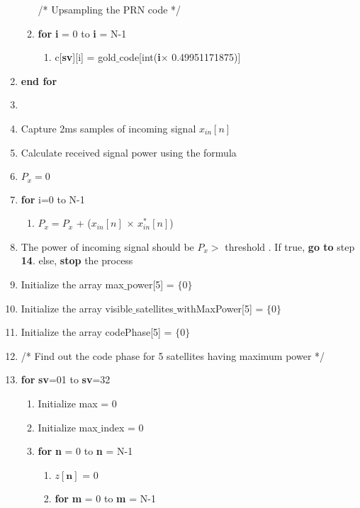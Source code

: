 \documentclass[journal,10pt,onecolumn]{article}
\begin{document}
\begin{enumerate}
\begin{enumerate}
    /* Upsampling the PRN code */
        \item[] \textbf{for} \textbf{i} = 0 to \textbf{i} = N-1
        \begin{enumerate}
            \item[] c[\textbf{sv}][i] = gold$\_$code[int(\textbf{i}$\times$ 0.49951171875)]
        \end{enumerate}
        
    \end{enumerate}
    \item[] \textbf{end for}
    \item[] \item Capture 2ms samples of incoming signal $x_{in}[n]$
    \item Calculate received signal power using the formula
    \item[] $P_x=0$
    \item[] \textbf{for} i=0 to N-1
    \begin{enumerate}
        \item[] $P_x= P_x$ + ($x_{in}[n]$ $\times$ $x^*_{in}[n]$)
    \end{enumerate} 
    \item The power of incoming signal should be $P_x$$>$ threshold . If true, \textbf{go to} step \textbf{14}. else, \textbf{stop} the process
    \item Initialize the array max$\_$power[5] = $\{0\}$
    \item Initialize the array visible$\_$satellites$\_$withMaxPower[5] = $\{0\}$
    \item Initialize the array codePhase[5] = $\{0\}$
    \item [] /* Find out the code phase for 5 satellites having maximum power */ 
    \item \textbf{for} \textbf{sv}=01 to \textbf{sv}=32
    
    \begin{enumerate}
        \item[] Initialize max = 0
        \item[] Initialize max$\_$index = 0
        \item[] \textbf{for} \textbf{n} = 0 to \textbf{n} = N-1
        
        \begin{enumerate}
            \item[] $z[\textbf{n}]$ = 0
            \item[]  \textbf{for} \textbf{m} = 0 to \textbf{m} = N-1
            

\end{enumerate}
\end{enumerate}
\end{enumerate}
\end{document}
